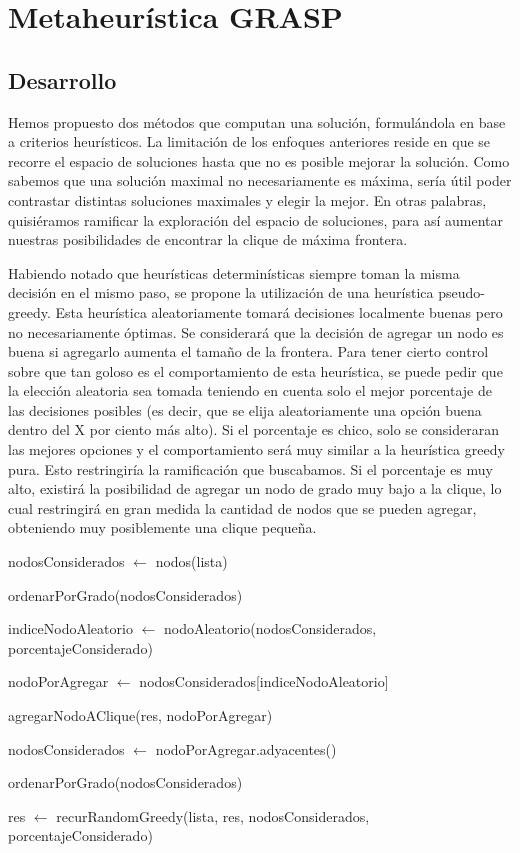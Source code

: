 \section{Metaheurística GRASP}
	\subsection{Desarrollo}
Hemos propuesto dos métodos que computan una solución, formulándola en base a criterios heurísticos. La limitación de los enfoques anteriores reside en que se recorre el espacio de soluciones hasta que no es posible mejorar la solución. Como sabemos que una solución maximal no necesariamente es máxima, sería útil poder contrastar distintas soluciones maximales y elegir la mejor. En otras palabras, quisiéramos ramificar la exploración del espacio de soluciones, para así aumentar nuestras posibilidades de encontrar la clique de máxima frontera.

Habiendo notado que heurísticas determinísticas siempre toman la misma decisión en el mismo paso, se propone la utilización de una heurística pseudo-greedy. Esta heurística aleatoriamente tomará decisiones localmente buenas pero no necesariamente óptimas. Se considerará que la decisión de agregar un nodo es buena si agregarlo aumenta el tamaño de la frontera. Para tener cierto control sobre que tan goloso es el comportamiento de esta heurística, se puede pedir que la elección aleatoria sea tomada teniendo en cuenta solo el mejor porcentaje de las decisiones posibles (es decir, que se elija aleatoriamente una opción buena dentro del X por ciento más alto). Si el porcentaje es chico, solo se consideraran las mejores opciones y el comportamiento será muy similar a la heurística greedy pura. Esto restringiría la ramificación que buscabamos. Si el porcentaje es muy alto, existirá la posibilidad de agregar un nodo de grado muy bajo a la clique, lo cual restringirá en gran medida la cantidad de nodos que se pueden agregar, obteniendo muy posiblemente una clique pequeña. 


\begin{algorithm}[H]
	\NoCaptionOfAlgo
	\caption{}
	
	nodosConsiderados $\leftarrow$ nodos(lista)
	
	ordenarPorGrado(nodosConsiderados)
	
	indiceNodoAleatorio $\leftarrow$ nodoAleatorio(nodosConsiderados, porcentajeConsiderado)
	
	nodoPorAgregar $\leftarrow$ nodosConsiderados[indiceNodoAleatorio]
	
	agregarNodoAClique(res, nodoPorAgregar)
	
	nodosConsiderados $\leftarrow$ nodoPorAgregar.adyacentes()

	ordenarPorGrado(nodosConsiderados)
	
	res $\leftarrow$ recurRandomGreedy(lista, res, nodosConsiderados, porcentajeConsiderado)


\end{algorithm}

